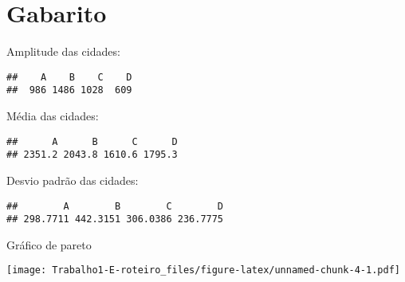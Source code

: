 \documentclass[]{article}
\begin{document}
\section{Gabarito}\label{gabarito}

Amplitude das cidades:

\begin{verbatim}
##    A    B    C    D 
##  986 1486 1028  609
\end{verbatim}

Média das cidades:

\begin{verbatim}
##      A      B      C      D 
## 2351.2 2043.8 1610.6 1795.3
\end{verbatim}

Desvio padrão das cidades:

\begin{verbatim}
##        A        B        C        D 
## 298.7711 442.3151 306.0386 236.7775
\end{verbatim}

Gráfico de pareto

\texttt{[image: Trabalho1-E-roteiro\_files/figure-latex/unnamed-chunk-4-1.pdf]}\\
\end{document}
